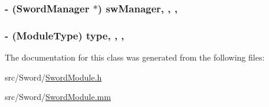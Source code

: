 \hypertarget{interface_sword_module_a387446958708000f3a5ea20ff5f340db}{
\subsubsection[{sw\-Manager}]{\setlength{\rightskip}{0pt plus 5cm}-\/ ({\bf Sword\-Manager} $\ast$) sw\-Manager\hspace{0.3cm}{\ttfamily [read]}, {\ttfamily [write]}, {\ttfamily [atomic]}, {\ttfamily [retain]}}}\label{interface_sword_module_a387446958708000f3a5ea20ff5f340db}
\hypertarget{interface_sword_module_a69cc06aed2c7e6cbe7b4c09b62e4a57d}{
\subsubsection[{type}]{\setlength{\rightskip}{0pt plus 5cm}-\/ ({\bf Module\-Type}) type\hspace{0.3cm}{\ttfamily [read]}, {\ttfamily [write]}, {\ttfamily [atomic]}, {\ttfamily [assign]}}}\label{interface_sword_module_a69cc06aed2c7e6cbe7b4c09b62e4a57d}


The documentation for this class was generated from the following files\-:\begin{DoxyCompactItemize}
\item 
src/\-Sword/\hyperlink{_sword_module_8h}{Sword\-Module.\-h}\item 
src/\-Sword/\hyperlink{_sword_module_8mm}{Sword\-Module.\-mm}\end{DoxyCompactItemize}
